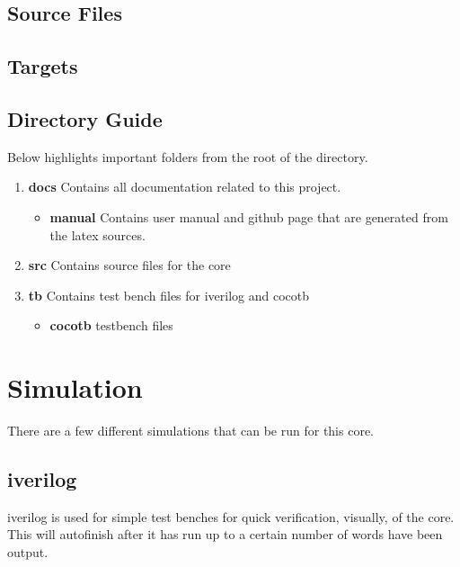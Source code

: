 \subsection{Source Files}



\subsection{Targets}



\subsection{Directory Guide}

\par
Below highlights important folders from the root of the directory.

\begin{enumerate}
  \item \textbf{docs} Contains all documentation related to this project.
    \begin{itemize}
      \item \textbf{manual} Contains user manual and github page that are generated from the latex sources.
    \end{itemize}
  \item \textbf{src} Contains source files for the core
  \item \textbf{tb} Contains test bench files for iverilog and cocotb
    \begin{itemize}
      \item \textbf{cocotb} testbench files
    \end{itemize}
\end{enumerate}

\newpage

\section{Simulation}
\par
There are a few different simulations that can be run for this core.

\subsection{iverilog}
\par
iverilog is used for simple test benches for quick verification, visually, of the core. This will autofinish after it has
run up to a certain number of words have been output.


